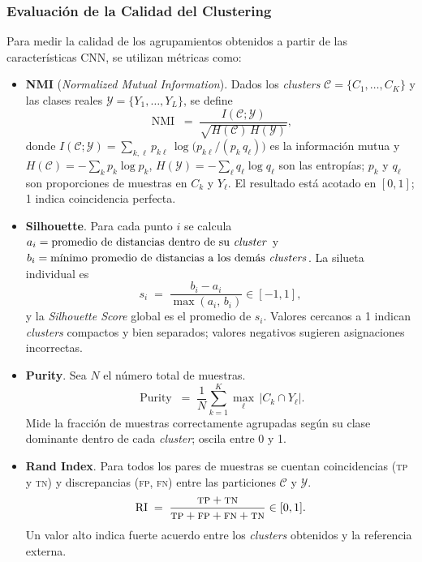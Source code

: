 \subsubsection*{Evaluación de la Calidad del Clustering}
Para medir la calidad de los agrupamientos obtenidos a partir de las características CNN, se utilizan métricas como:
\begin{itemize}
    \item \textbf{NMI} (\emph{Normalized Mutual Information}).
    Dados los \emph{clusters} \( \mathcal{C}=\{C_1,\dots,C_K\} \) y las clases reales \( \mathcal{Y}=\{Y_1,\dots,Y_L\} \), se define
    \[
        \operatorname{NMI} \;=\;
        \frac{ I(\mathcal{C};\mathcal{Y}) }{\sqrt{ H(\mathcal{C})\,H(\mathcal{Y}) }},
    \]
    donde \(I(\mathcal{C};\mathcal{Y}) = \sum_{k,\ell} p_{k\ell}\,\log\!\bigl(p_{k\ell}/(p_k\,q_\ell)\bigr)\) es la información mutua y
    \(H(\mathcal{C}) = -\sum_k p_k \log p_k\), \(H(\mathcal{Y}) = -\sum_\ell q_\ell \log q_\ell\) son las entropías; \(p_k\) y \(q_\ell\) son proporciones de muestras en \(C_k\) y \(Y_\ell\). El resultado está acotado en \([0,1]\); 1 indica coincidencia perfecta.

    \item \textbf{Silhouette}.
    Para cada punto \(i\) se calcula
    \(a_i = \text{promedio de distancias dentro de su \emph{cluster}}\) y
    \(b_i = \text{mínimo promedio de distancias a los demás \emph{clusters}}\).
    La silueta individual es
    \[
        s_i \;=\; \frac{b_i - a_i}{\max(a_i,\,b_i)} \in [-1,1],
    \]
    y la \emph{Silhouette Score} global es el promedio de \(s_i\). Valores cercanos a 1 indican \emph{clusters} compactos y bien separados; valores negativos sugieren asignaciones incorrectas.

    \item \textbf{Purity}.
    Sea \(N\) el número total de muestras.
    \[
        \operatorname{Purity} \;=\; \frac{1}{N}\sum_{k=1}^{K} \max_{\ell}\,|C_k \cap Y_\ell|.
    \]
    Mide la fracción de muestras correctamente agrupadas según su clase dominante dentro de cada \emph{cluster}; oscila entre 0 y 1.

    \item \textbf{Rand Index}.
    Para todos los pares de muestras se cuentan coincidencias (\textsc{tp} y \textsc{tn}) y discrepancias (\textsc{fp}, \textsc{fn}) entre las particiones \(\mathcal{C}\) y \(\mathcal{Y}\).
    \[
        \operatorname{RI} \;=\; \frac{\textsc{tp}+\textsc{tn}}{\textsc{tp}+\textsc{fp}+\textsc{fn}+\textsc{tn}} \in [0,1].
    \]
    Un valor alto indica fuerte acuerdo entre los \emph{clusters} obtenidos y la referencia externa.
\end{itemize}


